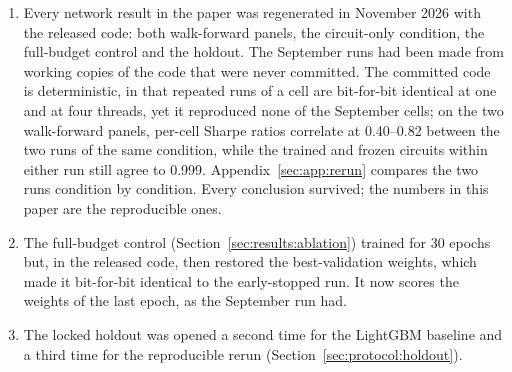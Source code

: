 \begin{enumerate}
    contrast; they are not counted, and counting them would lower every
    Deflated Sharpe Ratio further.
  \item Every network result in the paper was regenerated in November 2026
    with the released code: both walk-forward panels, the circuit-only
    condition, the full-budget control and the holdout. The September runs had
    been made from working copies of the code that were never committed. The
    committed code is
    deterministic, in that repeated runs of a cell are bit-for-bit identical at
    one and at four threads, yet it reproduced none of the September cells;
    on the two walk-forward panels, per-cell Sharpe ratios correlate at
    \numrange{0.40}{0.82} between the two runs of the same condition, while the trained and frozen circuits within
    either run still agree to \num{0.999}. Appendix~\ref{sec:app:rerun}
    compares the two runs condition by condition. Every conclusion survived;
    the numbers in this paper are the reproducible ones.
  \item The full-budget control (Section~\ref{sec:results:ablation}) trained
    for 30 epochs but, in the released code, then restored the
    best-validation weights, which made it bit-for-bit identical to the
    early-stopped run. It now scores the weights of the last epoch, as the
    September run had.
  \item The locked holdout was opened a second time for the LightGBM baseline
    and a third time for the reproducible rerun
    (Section~\ref{sec:protocol:holdout}).
\end{enumerate}
